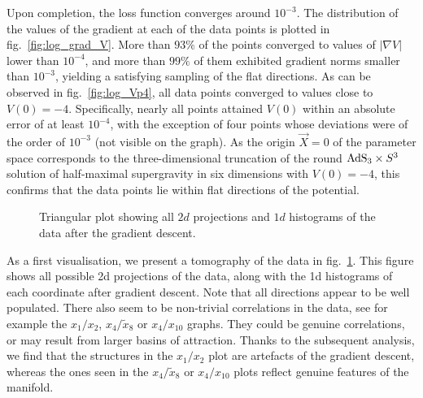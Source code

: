 \documentclass[11pt,a4paper]{article}
\begin{document}
	Upon completion, the loss function converges around $10^{-3}$. The distribution of the values of the gradient at each of the data points is plotted in fig.~\ref{fig:log_grad_V}. More than $93\%$ of the points converged to values of $\vert\nabla V\vert$ lower than $10^{-4}$, and more than $99\%$ of them exhibited gradient norms smaller than $10^{-3}$, yielding a satisfying sampling of the flat directions. As can be observed in fig.~\ref{fig:log_Vp4}, all data points converged to values close to $V(0)=-4$. Specifically, nearly all points attained $V(0)$ within an absolute error of at least $10^{-4}$, with the exception of four points whose deviations were of the order of $10^{-3}$ (not visible on the graph). As the origin $\vec{X}=0$ of the parameter space corresponds to the three-dimensional truncation of the round ${\rm AdS}_{3}\times S^{3}$ solution of half-maximal supergravity in six dimensions with $V(0)=-4$, this confirms that the data points lie within flat directions of the potential.

	\begin{figure}[!b]
		\centering
		\caption{Triangular plot showing all $2d$ projections and $1d$ histograms of the data after the gradient descent.}
		\label{triangular_plot_1_2_4_8_10}
	\end{figure}
	
	As a first visualisation, we present a tomography of the data in fig.~\ref{triangular_plot_1_2_4_8_10}. This figure shows all possible 2d projections of the data, along with the 1d histograms of each coordinate after gradient descent. Note that all directions appear to be well populated. There also seem to be non-trivial correlations in the data, see for example the $x_1/x_2$, $x_4/\tilde{x}_8$ or $x_4/x_{10}$ graphs. They could be genuine correlations, or may result from larger basins of attraction. Thanks to the subsequent analysis, we find that the structures in the $x_1/x_2$ plot are artefacts of the gradient descent, whereas the ones seen in the $x_4/\tilde{x}_8$ or $x_4/x_{10}$ plots reflect genuine features of the manifold. 
\end{document}

